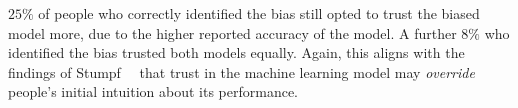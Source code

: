 $25\%$ of people who correctly identified the bias still opted to trust the biased model more, due to the higher reported accuracy of the model.
A further $8\%$ who identified the bias trusted both models equally.
Again, this aligns with the findings of Stumpf~\etal~\cite{harmful} that trust in the machine learning model may \emph{override} people's initial intuition about its performance.

